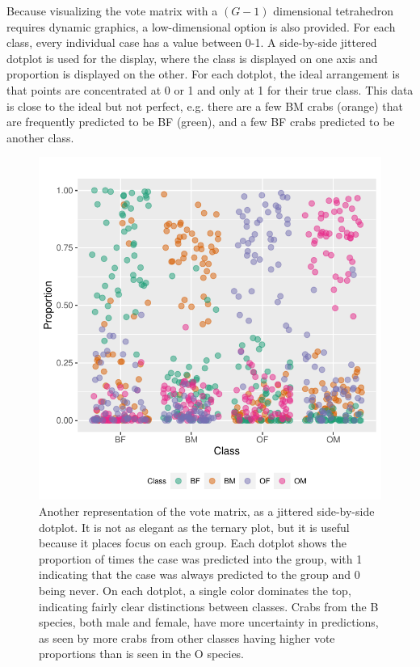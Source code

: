 \documentclass[smallextended,natbib]{svjour3}\usepackage[]{graphicx}\usepackage[]{xcolor}
\makeatletter
\def\maxwidth{ %
  \ifdim\Gin@nat@width>\linewidth
    \linewidth
  \else
    \Gin@nat@width
  \fi
}
\newenvironment{knitrout}{}{} %
\makeatother
\begin{document}
Because visualizing the vote matrix with a $(G-1)$ dimensional tetrahedron requires dynamic graphics, a low-dimensional option is also provided. For each class, every individual case has a value between 0-1. A side-by-side jittered dotplot is used for the display, where the class is displayed on one axis and proportion is displayed on the other. For each dotplot, the ideal arrangement is that points are concentrated at 0 or 1 and only at 1 for their true class. This data is close to the ideal but not perfect, e.g. there are a few BM crabs (orange) that are frequently predicted to be BF (green), and a few BF crabs predicted to be another class.

\begin{figure}[hbpt]
\centering
\begin{knitrout}
\color{fgcolor}
\includegraphics[width=\maxwidth]{side-1} 
\end{knitrout}
\caption{Another representation of the vote matrix, as a jittered side-by-side dotplot. It is not as elegant as the ternary plot, but it is useful because it places focus on each group. Each dotplot shows the proportion of times the case was predicted into the group, with 1 indicating that the case was always predicted to the group and 0 being never. On each dotplot, a single color dominates the top, indicating fairly clear distinctions between classes. Crabs from the B species, both male and female, have more uncertainty in predictions, as seen by more crabs from other classes having higher vote proportions than is seen in the O species.}
\label{sideby}
\end{figure}
 
\end{document}
